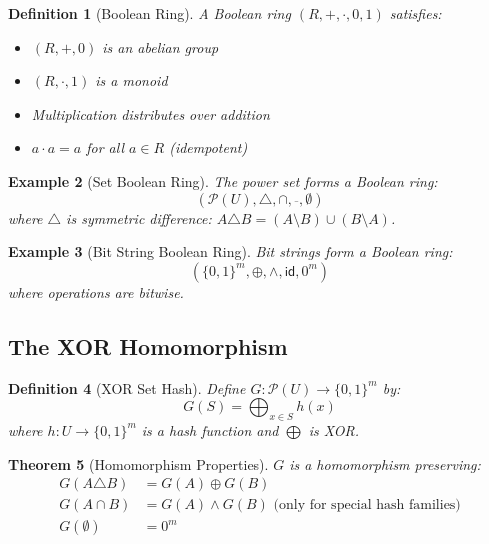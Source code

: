 \documentclass[11pt,final,hidelinks]{article}
\newcommand{\XOR}{\oplus}
\newcommand{\AND}{\land}
\newcommand{\SymDiff}{\triangle}
\newcommand{\BitString}{\{0,1\}^m}
\newcommand{\PowerSet}[1]{\mathcal{P}(#1)}
\newcommand{\id}{\mathsf{id}}
\newtheorem{theorem}{Theorem}[section]
\newtheorem{definition}[theorem]{Definition}
\newtheorem{example}[theorem]{Example}
\begin{document}
\begin{definition}[Boolean Ring]
A Boolean ring $(R, +, \cdot, 0, 1)$ satisfies:
\begin{itemize}
    \item $(R, +, 0)$ is an abelian group
    \item $(R, \cdot, 1)$ is a monoid
    \item Multiplication distributes over addition
    \item $a \cdot a = a$ for all $a \in R$ (idempotent)
\end{itemize}
\end{definition}

\begin{example}[Set Boolean Ring]
The power set forms a Boolean ring:
\begin{equation}
(\PowerSet{U}, \SymDiff, \cap, \overline{}, \emptyset)
\end{equation}
where $\SymDiff$ is symmetric difference: $A \SymDiff B = (A \setminus B) \cup (B \setminus A)$.
\end{example}

\begin{example}[Bit String Boolean Ring]
Bit strings form a Boolean ring:
\begin{equation}
(\BitString, \XOR, \AND, \id, 0^m)
\end{equation}
where operations are bitwise.
\end{example}

\subsection{The XOR Homomorphism}

\begin{definition}[XOR Set Hash]
Define $G: \PowerSet{U} \to \BitString$ by:
\begin{equation}
G(S) = \bigoplus_{x \in S} h(x)
\end{equation}
where $h: U \to \BitString$ is a hash function and $\bigoplus$ is XOR.
\end{definition}

\begin{theorem}[Homomorphism Properties]
$G$ is a homomorphism preserving:
\begin{align}
G(A \SymDiff B) &= G(A) \XOR G(B)\\
G(A \cap B) &= G(A) \AND G(B) \text{ (only for special hash families)}\\
G(\emptyset) &= 0^m
\end{align}
\end{theorem}
\end{document}

